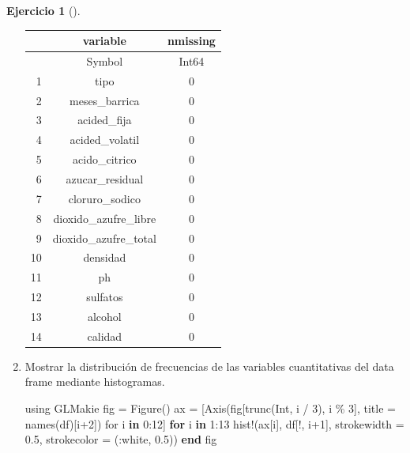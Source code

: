 \documentclass[
  a4paper,
]{scrreport}
\newenvironment{Shaded}{\begin{snugshade}}{\end{snugshade}}
\newcommand{\BuiltInTok}[1]{\textcolor[rgb]{0.00,0.23,0.31}{#1}}
\newcommand{\ControlFlowTok}[1]{\textcolor[rgb]{0.00,0.23,0.31}{\textbf{#1}}}
\newcommand{\DataTypeTok}[1]{\textcolor[rgb]{0.68,0.00,0.00}{#1}}
\newcommand{\FloatTok}[1]{\textcolor[rgb]{0.68,0.00,0.00}{#1}}
\newcommand{\FunctionTok}[1]{\textcolor[rgb]{0.28,0.35,0.67}{#1}}
\newcommand{\ImportTok}[1]{\textcolor[rgb]{0.00,0.46,0.62}{#1}}
\newcommand{\KeywordTok}[1]{\textcolor[rgb]{0.00,0.23,0.31}{\textbf{#1}}}
\newcommand{\NormalTok}[1]{\textcolor[rgb]{0.00,0.23,0.31}{#1}}
\newcommand{\OperatorTok}[1]{\textcolor[rgb]{0.37,0.37,0.37}{#1}}
\theoremstyle{definition}
\newtheorem{exercise}{Ejercicio}[chapter]
\theoremstyle{remark}
\begin{document}
\begin{exercise}[]
\begin{enumerate}
\begin{tcolorbox}
  \begin{tabular}{r|cc}
      & variable & nmissing\\
      \hline
      & Symbol & Int64\\
      \hline
      1 & tipo & 0 \\
      2 & meses\_barrica & 0 \\
      3 & acided\_fija & 0 \\
      4 & acided\_volatil & 0 \\
      5 & acido\_citrico & 0 \\
      6 & azucar\_residual & 0 \\
      7 & cloruro\_sodico & 0 \\
      8 & dioxido\_azufre\_libre & 0 \\
      9 & dioxido\_azufre\_total & 0 \\
      10 & densidad & 0 \\
      11 & ph & 0 \\
      12 & sulfatos & 0 \\
      13 & alcohol & 0 \\
      14 & calidad & 0 \\
  \end{tabular}

  \end{tcolorbox}
\item
  Mostrar la distribución de frecuencias de las variables cuantitativas
  del data frame mediante histogramas.

  \begin{tcolorbox}[enhanced jigsaw, toptitle=1mm, breakable, toprule=.15mm, opacitybacktitle=0.6, coltitle=black, titlerule=0mm, arc=.35mm, title=\textcolor{quarto-callout-tip-color}{\faLightbulb}\hspace{0.5em}{Solución}, rightrule=.15mm, opacityback=0, colback=white, bottomrule=.15mm, leftrule=.75mm, colbacktitle=quarto-callout-tip-color!10!white, bottomtitle=1mm, colframe=quarto-callout-tip-color-frame, left=2mm]

\begin{Shaded}
\begin{Highlighting}[]
\ImportTok{using} \BuiltInTok{GLMakie}
\NormalTok{fig }\OperatorTok{=} \FunctionTok{Figure}\NormalTok{() }
\NormalTok{ax }\OperatorTok{=}\NormalTok{ [}\FunctionTok{Axis}\NormalTok{(fig[}\FunctionTok{trunc}\NormalTok{(}\DataTypeTok{Int}\NormalTok{, i }\OperatorTok{/} \FloatTok{3}\NormalTok{), i }\OperatorTok{\%} \FloatTok{3}\NormalTok{], title }\OperatorTok{=} \FunctionTok{names}\NormalTok{(df)[i}\OperatorTok{+}\FloatTok{2}\NormalTok{]) for i }\KeywordTok{in} \FloatTok{0}\OperatorTok{:}\FloatTok{12}\NormalTok{]}
\ControlFlowTok{for}\NormalTok{ i }\KeywordTok{in} \FloatTok{1}\OperatorTok{:}\FloatTok{13}
    \FunctionTok{hist!}\NormalTok{(ax[i], df[!, i}\OperatorTok{+}\FloatTok{1}\NormalTok{], strokewidth }\OperatorTok{=} \FloatTok{0.5}\NormalTok{, strokecolor }\OperatorTok{=}\NormalTok{ (}\OperatorTok{:}\NormalTok{white, }\FloatTok{0.5}\NormalTok{))}
\ControlFlowTok{end}
\NormalTok{fig}
\end{Highlighting}
\end{Shaded}


\end{tcolorbox}
\end{enumerate}
\end{exercise}
\end{document}

